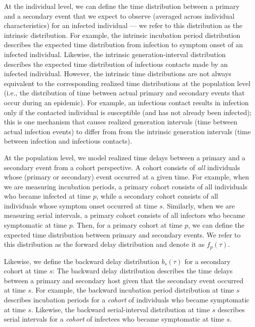 \documentclass[12pt]{article}
\newcommand{\psymp}{\ensuremath{p}} %
\newcommand{\ssymp}{\ensuremath{s}} %
\begin{document}
At the individual level, we can define the time distribution between a primary and a secondary event that we expect to observe (averaged across individual characteristics) for an infected individual --- we refer to this distribution as the intrinsic distribution.
For example, the intrinsic incubation period distribution describes the expected time distribution from infection to symptom onset of an infected individual.
Likewise, the intrinsic generation-interval distribution describes the expected time distribution of infectious contacts made by an infected individual.
However, the intrinsic time distributions are not always equivalent to the corresponding realized time distributions at the population level (i.e., the distribution of time between actual primary and secondary events that occur during an epidemic).
For example, an infectious contact results in infection only if the contacted individual is susceptible (and has not already been infected);
this is one mechanism that causes realized generation intervals (time between actual infection events) to differ from from the intrinsic generation intervals (time between infection and infectious contacts).

At the population level, we model realized time delays between a primary and a secondary event from a cohort perspective.
A cohort consists of \emph{all} individuals whose (primary or secondary) event occurred at a given time. 
For example, when we are measuring incubation periods, a primary cohort consists of all individuals who became infected at time \psymp, while a secondary cohort consists of all individuals whose symptom onset occurred at time $\ssymp$.
Similarly, when we are measuring serial intervals, a primary cohort consists of all infectors who became symptomatic at time $\psymp$.
Then, for a primary cohort at time $\psymp$, we can define the expected time distribution between primary and secondary events. 
We refer to this distribution as the forward delay distribution and denote it as $f_\psymp(\tau)$.

Likewise, we define the backward delay distribution $b_\ssymp(\tau)$ for a secondary cohort at time $\ssymp$:
The backward delay distribution describes the time delays between a primary and secondary host given that the secondary event occurred at time $\ssymp$.
For example, the backward incubation period distribution at time $\ssymp$ describes incubation periods for a \emph{cohort} of individuals who became symptomatic at time $\ssymp$.
Likewise, the backward serial-interval distribution at time $\ssymp$ describes serial intervals for a \emph{cohort} of infectees who became symptomatic at time $\ssymp$.
\end{document}
